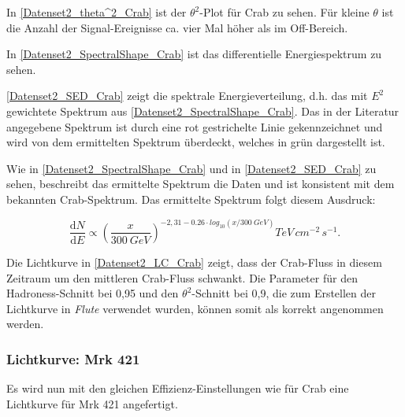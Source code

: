 In \autoref{Datenset2_theta^2_Crab} ist der $\theta^2$-Plot für Crab zu sehen. Für kleine $\theta$ ist die Anzahl der Signal-Ereignisse ca. vier Mal höher als im Off-Bereich.

In \autoref{Datenset2_SpectralShape_Crab} ist das differentielle Energiespektrum zu sehen.

\autoref{Datenset2_SED_Crab} zeigt die spektrale Energieverteilung, d.h. das mit $E^2$ gewichtete Spektrum aus \autoref{Datenset2_SpectralShape_Crab}.
Das in der Literatur angegebene Spektrum ist durch eine rot gestrichelte Linie gekennzeichnet und wird von dem ermittelten Spektrum überdeckt, welches in grün dargestellt ist.

Wie in \autoref{Datenset2_SpectralShape_Crab} und in \autoref{Datenset2_SED_Crab} zu sehen, beschreibt das ermittelte Spektrum die Daten und ist konsistent mit dem bekannten Crab-Spektrum.
Das ermittelte Spektrum folgt diesem Ausdruck:

\begin{equation}
\frac{\mathrm{d}N}{\mathrm{d}E} \propto \left(\frac{x}{\SI{300}{GeV}}\right)^{-2,31-0.26\cdot log_{10}(x/\SI{300}{GeV})}\si{TeV\,cm^{-2}\,s^{-1}}.
\end{equation}

Die Lichtkurve in \autoref{Datenset2_LC_Crab} zeigt, dass der Crab-Fluss in diesem Zeitraum um den mittleren Crab-Fluss schwankt.
Die Parameter für den Hadroness-Schnitt bei 0,95 und den $\theta^2$-Schnitt bei 0,9, die zum Erstellen der Lichtkurve in \textit{Flute} verwendet wurden, können somit als korrekt angenommen werden.

\subsubsection{Lichtkurve: Mrk 421}
Es wird nun mit den gleichen Effizienz-Einstellungen wie für Crab eine Lichtkurve für Mrk 421 angefertigt.

